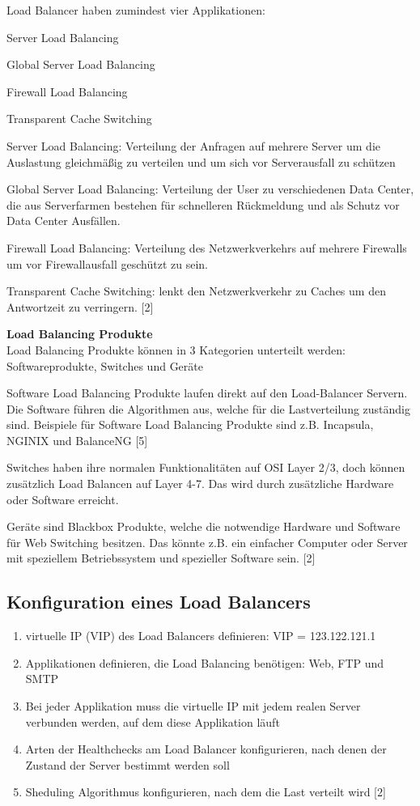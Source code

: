 Load Balancer haben zumindest vier Applikationen:
\begin{list}{•}{}
\item Server Load Balancing
\item Global Server Load Balancing
\item Firewall Load Balancing
\item Transparent Cache Switching
\end{list}

Server Load Balancing: Verteilung der Anfragen auf mehrere Server um die Auslastung gleichmäßig zu verteilen und um sich vor Serverausfall zu schützen

Global Server Load Balancing: Verteilung der User zu verschiedenen Data Center, die aus Serverfarmen bestehen für schnelleren Rückmeldung und als Schutz vor Data Center Ausfällen.

Firewall Load Balancing: Verteilung des Netzwerkverkehrs auf mehrere Firewalls um vor Firewallausfall geschützt zu sein.

Transparent Cache Switching: lenkt den Netzwerkverkehr zu Caches um den Antwortzeit zu verringern. [2]

\textbf{Load Balancing Produkte} \\
Load Balancing Produkte können in 3 Kategorien unterteilt werden: Softwareprodukte,  Switches und  Geräte

Software Load Balancing Produkte laufen direkt auf den Load-Balancer Servern. Die Software führen die Algorithmen aus, welche für die Lastverteilung zuständig sind. Beispiele für Software Load Balancing Produkte sind z.B. Incapsula, NGINIX und BalanceNG [5]

Switches haben ihre normalen Funktionalitäten auf OSI Layer 2/3, doch können zusätzlich Load Balancen auf Layer 4-7. Das wird durch zusätzliche Hardware oder Software erreicht.  

Geräte sind Blackbox Produkte, welche die notwendige Hardware und Software für Web Switching besitzen. Das könnte z.B. ein einfacher Computer oder Server mit speziellem Betriebssystem und spezieller Software sein. [2]

\subsection{Konfiguration eines Load Balancers}
\label{sec:Konfiguration eines Load Balancers}
\begin{enumerate}
\item virtuelle IP (VIP) des Load Balancers definieren: VIP = 123.122.121.1
\item Applikationen definieren, die Load Balancing benötigen: Web, FTP und SMTP
\item Bei jeder Applikation muss die virtuelle IP mit jedem realen Server verbunden werden, auf dem diese Applikation läuft
\item Arten der Healthchecks am Load Balancer konfigurieren, nach denen der Zustand der Server bestimmt werden soll
\item Sheduling Algorithmus konfigurieren, nach dem die Last verteilt wird [2]
\end{enumerate}

